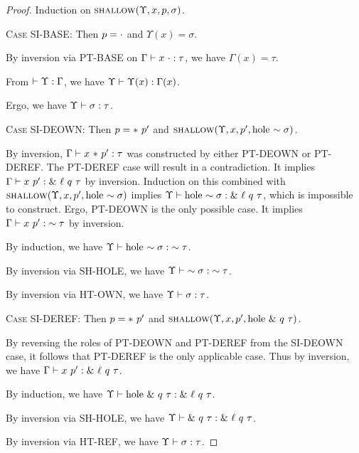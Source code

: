 \documentclass{article}
\begin{document}
\begin{proof}
  Induction on $\textsc{shallow}({\Upsilon},{x},{p},{\sigma})$.

  \textsc{Case SI-BASE}:
    Then $p = \cdot$ and $\Upsilon(x) = \sigma$.

    By inversion via \textsc{PT-BASE} on ${{\Gamma}} \vdash {{x}\ {\cdot}} : {{\tau}}$,
    we have $\Gamma(x) = \tau$.

    From $\vdash {\Upsilon} : {\Gamma}$, we have ${\Upsilon} \vdash {\Upsilon(x)} : {\Gamma(x)}$.

    Ergo, we have ${\Upsilon} \vdash {\sigma} : {\tau}$.

  \textsc{Case SI-DEOWN}: 
    Then $p = *\ {p'}$ and $\textsc{shallow}({\Upsilon},{x},{p'},{\textrm{hole}\ {\sim {\sigma}}})$.

    By inversion, ${{\Gamma}} \vdash {{x}\ {*\ {p'}}} : {{\tau}}$ was constructed by either
    \textsc{PT-DEOWN} or \textsc{PT-DEREF}. The \textsc{PT-DEREF} case will result
    in a contradiction. It implies ${{\Gamma}} \vdash {{x}\ {p'}} : {{\&\ {\ell}\ {q}\ {\tau}}}$ by inversion.
    Induction on this combined with $\textsc{shallow}({\Upsilon},{x},{p'},{\textrm{hole}\ {\sim {\sigma}}})$ implies
    ${\Upsilon} \vdash {\textrm{hole}\ {\sim {\sigma}}} : {\&\ {\ell}\ {q}\ {\tau}}$, which is impossible to construct.
    Ergo, \textsc{PT-DEOWN} is the only possible case.
    It implies ${{\Gamma}} \vdash {{x}\ {p'}} : {{\sim {\tau}}}$ by inversion.

    By induction, we have ${\Upsilon} \vdash {\textrm{hole}\ {\sim {\sigma}}} : {\sim {\tau}}$.

    By inversion via \textsc{SH-HOLE}, we have ${\Upsilon} \vdash {\sim {\sigma}} : {\sim {\tau}}$.

    By inversion via \textsc{HT-OWN}, we have ${\Upsilon} \vdash {\sigma} : {\tau}$.
  
  \textsc{Case SI-DEREF}:
    Then $p = *\ {p'}$ and $\textsc{shallow}({\Upsilon},{x},{p'},{\textrm{hole}\ {\&\ {q}\ {\tau}}})$.

    By reversing the roles of \textsc{PT-DEOWN} and \textsc{PT-DEREF} from the \textsc{SI-DEOWN}
    case, it follows that \textsc{PT-DEREF} is the only applicable case.
    Thus by inversion, we have ${{\Gamma}} \vdash {{x}\ {p'}} : {{\&\ {\ell}\ {q}\ {\tau}}}$.

    By induction, we have ${\Upsilon} \vdash {\textrm{hole}\ {\&\ {q}\ {\tau}}} : {\&\ {\ell}\ {q}\ {\tau}}$.

    By inversion via \textsc{SH-HOLE}, we have
    ${\Upsilon} \vdash {\&\ {q}\ {\tau}} : {\&\ {\ell}\ {q}\ {\tau}}$.

    By inversion via \textsc{HT-REF}, we have ${\Upsilon} \vdash {\sigma} : {\tau}$.


\end{proof}
\end{document}
